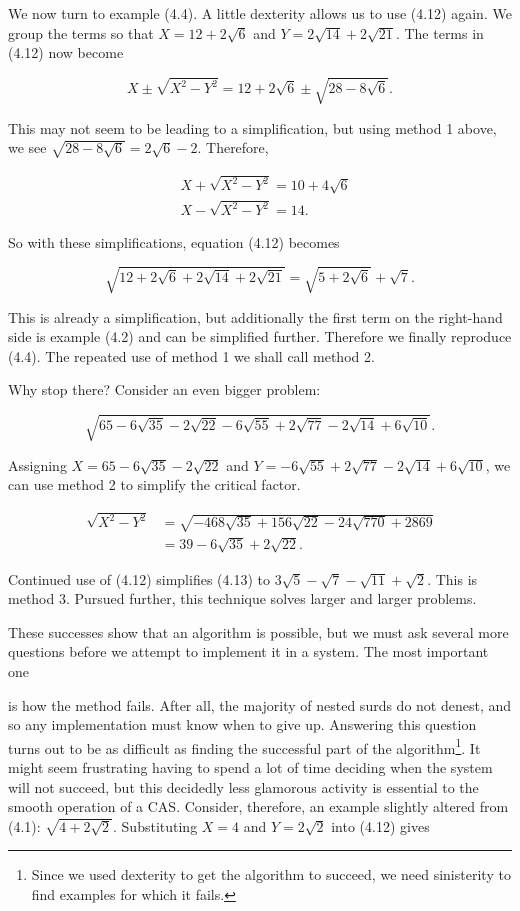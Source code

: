 \documentclass[11pt,letterpaper]{article}
\begin{document}
We now turn to example (4.4). A little dexterity allows us to use (4.12) again. We group the terms so that $X=12+2 \sqrt{6}$ and $Y=2 \sqrt{14}+2 \sqrt{21}$. The terms in (4.12) now become

\[
X \pm \sqrt{X^{2}-Y^{2}}=12+2 \sqrt{6} \pm \sqrt{28-8 \sqrt{6}} .
\]

This may not seem to be leading to a simplification, but using method 1 above, we see $\sqrt{28-8 \sqrt{6}}=2 \sqrt{6}-2$. Therefore,

\[
\begin{aligned}
& X+\sqrt{X^{2}-Y^{2}}=10+4 \sqrt{6} \\
& X-\sqrt{X^{2}-Y^{2}}=14 .
\end{aligned}
\]

So with these simplifications, equation (4.12) becomes

\[
\sqrt{12+2 \sqrt{6}+2 \sqrt{14}+2 \sqrt{21}}=\sqrt{5+2 \sqrt{6}}+\sqrt{7} .
\]

This is already a simplification, but additionally the first term on the right-hand side is example (4.2) and can be simplified further. Therefore we finally reproduce (4.4). The repeated use of method 1 we shall call method 2.

Why stop there? Consider an even bigger problem:


\begin{equation*}
\sqrt{65-6 \sqrt{35}-2 \sqrt{22}-6 \sqrt{55}+2 \sqrt{77}-2 \sqrt{14}+6 \sqrt{10}} . \tag{4.13}\label{eq:4.13}
\end{equation*}


Assigning $X=65-6 \sqrt{35}-2 \sqrt{22}$ and $Y=-6 \sqrt{55}+2 \sqrt{77}-2 \sqrt{14}+6 \sqrt{10}$, we can use method 2 to simplify the critical factor.

\[
\begin{aligned}
\sqrt{X^{2}-Y^{2}} & =\sqrt{-468 \sqrt{35}+156 \sqrt{22}-24 \sqrt{770}+2869} \\
& =39-6 \sqrt{35}+2 \sqrt{22} .
\end{aligned}
\]

Continued use of (4.12) simplifies (4.13) to $3 \sqrt{5}-\sqrt{7}-\sqrt{11}+\sqrt{2}$. This is method 3. Pursued further, this technique solves larger and larger problems.

These successes show that an algorithm is possible, but we must ask several more questions before we attempt to implement it in a system. The most important one

is how the method fails. After all, the majority of nested surds do not denest, and so any implementation must know when to give up. Answering this question turns out to be as difficult as finding the successful part of the algorithm\footnote{Since we used dexterity to get the algorithm to succeed, we need sinisterity to find examples for which it fails.}. It might seem frustrating having to spend a lot of time deciding when the system will not succeed, but this decidedly less glamorous activity is essential to the smooth operation of a CAS. Consider, therefore, an example slightly altered from (4.1): $\sqrt{4+2 \sqrt{2}}$. Substituting $X=4$ and $Y=2 \sqrt{2}$ into (4.12) gives
\end{document}

